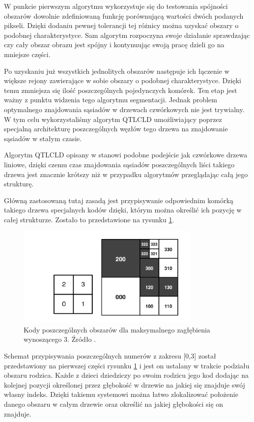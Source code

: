 \documentclass{classrep}
\begin{document}
W punkcie pierwszym algorytmu wykorzystuje się do testowania spójności obszarów dowolnie zdefiniowaną funkcję porównującą wartości dwóch podanych pikseli. Dzięki dodaniu pewnej tolerancji tej różnicy można uzyskać obszary o podobnej charakterystyce. Sam algorytm rozpoczyna swoje działanie sprawdzając czy cały obszar obrazu jest spójny i kontynuując swoją pracę dzieli go na mniejsze części.

Po uzyskaniu już wszystkich jednolitych obszarów następuje ich łączenie w większe rejony zawierające w sobie obszary o podobnej charakterystyce. Dzięki temu zmniejsza się ilość poszczególnych pojedynczych komórek. Ten etap jest ważny z punktu widzenia tego algorytmu segmentacji. Jednak problem optymalnego znajdowania sąsiadów w drzewach czwórkowych nie jest trywialny. W tym celu wykorzystaliśmy algorytm QTLCLD \cite{3} umożliwiający poprzez specjalną architekturę poszczególnych węzłów tego drzewa na znajdowanie sąsiadów w stałym czasie.

Algorytm QTLCLD opisany w \cite{3} stanowi podobne podejście jak czwórkowe drzewa liniowe, dzięki czemu czas znajdowania sąsiadów poszczególnych liści takiego drzewa jest znacznie krótszy niż w przypadku algorytmów przeglądając całą jego strukturę. 

Główną zastosowaną tutaj zasadą jest przypisywanie odpowiednim komórką takiego drzewa specjalnych kodów dzięki, którym można określić ich pozycję w całej strukturze. Zostało to przedstawione na rysunku \ref{fig_seg_kody}.

\begin{figure}[H]
  \centering
  \includegraphics[width=0.8\textwidth]{img/seg/kody}
  \caption{Kody poszczególnych obszarów dla maksymalnego zagłębienia wynoszącego 3. Źródło \cite{3}.}
  \label{fig_seg_kody}
\end{figure}

Schemat przypisywania poszczególnych numerów z zakresu [0,3] został przedstawiony na pierwszej części rysunku \ref{fig_seg_kody} i jest on ustalany w trakcie podziału obszaru rodzica. Każde z dzieci dziedziczy po swoim rodzicu jego kod dodając na kolejnej pozycji określonej przez głębokość w drzewie na jakiej się znajduje swój własny indeks. Dzięki takiemu systemowi można łatwo zlokalizować położenie danego obszaru w całym drzewie oraz określić na jakiej głębokości się on znajduje. 
\end{document}
